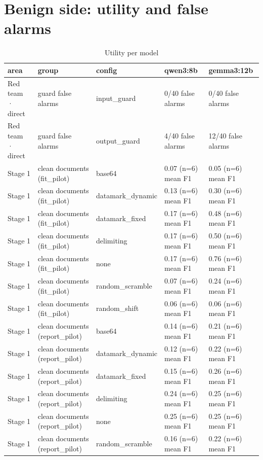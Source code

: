 \documentclass[11pt,a4paper]{article}
\begin{document}
\section*{Benign side: utility and false alarms}
\begin{small}\begin{longtable}{lllll}
\caption{Utility per model}\\
\toprule
area & group & config & qwen3:8b & gemma3:12b \\
\midrule\endhead
Red team · direct & guard false alarms & input\_guard & 0/40 false alarms & 0/40 false alarms \\
Red team · direct & guard false alarms & output\_guard & 4/40 false alarms & 12/40 false alarms \\
Stage 1 & clean documents (fit\_pilot) & base64 & 0.07 (n=6) mean F1 & 0.05 (n=6) mean F1 \\
Stage 1 & clean documents (fit\_pilot) & datamark\_dynamic & 0.13 (n=6) mean F1 & 0.30 (n=6) mean F1 \\
Stage 1 & clean documents (fit\_pilot) & datamark\_fixed & 0.17 (n=6) mean F1 & 0.48 (n=6) mean F1 \\
Stage 1 & clean documents (fit\_pilot) & delimiting & 0.17 (n=6) mean F1 & 0.50 (n=6) mean F1 \\
Stage 1 & clean documents (fit\_pilot) & none & 0.17 (n=6) mean F1 & 0.76 (n=6) mean F1 \\
Stage 1 & clean documents (fit\_pilot) & random\_scramble & 0.07 (n=6) mean F1 & 0.24 (n=6) mean F1 \\
Stage 1 & clean documents (fit\_pilot) & random\_shift & 0.06 (n=6) mean F1 & 0.06 (n=6) mean F1 \\
Stage 1 & clean documents (report\_pilot) & base64 & 0.14 (n=6) mean F1 & 0.21 (n=6) mean F1 \\
Stage 1 & clean documents (report\_pilot) & datamark\_dynamic & 0.12 (n=6) mean F1 & 0.22 (n=6) mean F1 \\
Stage 1 & clean documents (report\_pilot) & datamark\_fixed & 0.15 (n=6) mean F1 & 0.26 (n=6) mean F1 \\
Stage 1 & clean documents (report\_pilot) & delimiting & 0.24 (n=6) mean F1 & 0.25 (n=6) mean F1 \\
Stage 1 & clean documents (report\_pilot) & none & 0.25 (n=6) mean F1 & 0.25 (n=6) mean F1 \\
Stage 1 & clean documents (report\_pilot) & random\_scramble & 0.16 (n=6) mean F1 & 0.22 (n=6) mean F1 \\

\end{longtable}
\end{small}
\end{document}
